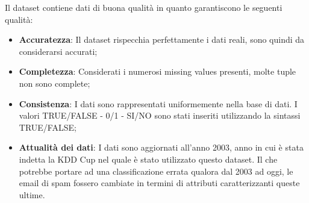 Il dataset contiene dati di buona qualità in quanto garantiscono le seguenti qualità:

\begin{itemize}
	\item \textbf{Accuratezza}: Il dataset rispecchia perfettamente i dati reali, sono quindi da considerarsi accurati;
	\item \textbf{Completezza}: Considerati i numerosi missing values presenti, molte tuple non sono complete;
	\item \textbf{Consistenza}: I dati sono rappresentati uniformemente nella base di dati. I valori TRUE/FALSE - 0/1 - SI/NO sono stati inseriti utilizzando la sintassi TRUE/FALSE;
	\item \textbf{Attualità dei dati}: I dati sono aggiornati all'anno 2003, anno in cui è stata indetta la KDD Cup nel quale è stato utilizzato questo dataset. Il che potrebbe portare ad una classificazione errata qualora dal 2003 ad oggi, le email di spam fossero cambiate in termini di attributi caratterizzanti queste ultime.
\end{itemize}



